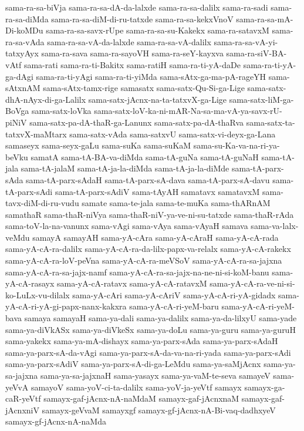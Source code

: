 {sama-ra-sa-biVja
sama-ra-sa-dA-da-lalxde
sama-ra-sa-dalilx
sama-ra-sadi
sama-ra-sa-diMda
sama-ra-sa-diM-di-ru-tatxde
sama-ra-sa-kekxVnoV
sama-ra-sa-mA-Di-koMDu
sama-ra-sa-savx-rUpe
sama-ra-sa-su-Kakekx
sama-ra-satavxM
sama-ra-sa-vAda
sama-ra-sa-vA-da-lalxde
sama-ra-sa-vA-dalilx
sama-ra-sa-vA-yi-tatxyAyx
sama-ra-sava
sama-ra-sayoVH
sama-ra-seY-kayxva
sama-ra-siV-BA-vAtf
sama-rati
sama-ra-ti-Bakitx
sama-ratiH
sama-ra-ti-yA-daDe
sama-ra-ti-yA-ga-dAgi
sama-ra-ti-yAgi
sama-ra-ti-yiMda
sama-sAtx-ga-ma-pA-rageYH
sama-sAtxnAM
sama-sAtx-tamx-rige
samasatx
sama-satx-Qu-Si-ga-Lige
sama-satx-dhA-nAyx-di-ga-Lalilx
sama-satx-jAcnx-na-ta-tatxvX-ga-Lige
sama-satx-liM-ga-BoVga
sama-satx-loVka
sama-satx-loV-ka-ni-mAR-Na-sa-ma-vA-ya-savx-rU-piNiV
sama-satx-pa-dA-thaR-ga-Lanunx
sama-satx-pa-dA-thaRva
sama-satx-ta-tatxvX-maMtarx
sama-satx-vAda
sama-satxvU
sama-satx-vi-deyx-ga-Lana
samaseyx
sama-seyx-gaLu
sama-suKa
sama-suKaM
sama-su-Ka-va-na-ri-ya-beVku
samatA
sama-tA-BA-va-diMda
sama-tA-guNa
sama-tA-guNaH
sama-tA-jala
sama-tA-jalaM
sama-tA-ja-la-diMda
sama-tA-ja-la-diMde
sama-tA-parx-sAda
sama-tA-parx-sAdaH
sama-tA-parx-sA-dava
sama-tA-parx-sA-davu
sama-tA-parx-sAdi
sama-tA-parx-sAdiV
sama-tAyAH
samatavx
samatavxM
sama-tavx-diM-di-ru-vudu
samate
sama-te-jala
sama-te-muKa
sama-thARnAM
samathaR
sama-thaR-niVya
sama-thaR-niV-ya-ve-ni-su-tatxde
sama-thaR-rAda
sama-toV-la-na-vanunx
sama-vAgi
sama-vAya
sama-vAyaH
samava
sama-va-lalx-veMdu
samayA
samayAH
sama-yA-cAra
sama-yA-cAraH
sama-yA-cA-rada
sama-yA-cA-ra-dalilx
sama-yA-cA-ra-da-lilx-papx-va-relalx
sama-yA-cA-rakekx
sama-yA-cA-ra-loV-peVna
sama-yA-cA-ra-meVSoV
sama-yA-cA-ra-sa-jajxna
sama-yA-cA-ra-sa-jajx-namf
sama-yA-cA-ra-sa-jajx-na-ne-ni-si-koM-banu
sama-yA-cA-rasayx
sama-yA-cA-ratavx
sama-yA-cA-ratavxM
sama-yA-cA-ra-ve-ni-si-ko-LuLx-vu-dilalx
sama-yA-cAri
sama-yA-cAriV
sama-yA-cA-ri-yA-gidadx
sama-yA-cA-ri-yA-gi-papx-nanx-kakxra
sama-yA-cA-ri-yeM-baru
sama-yA-cA-ri-yeM-bava
samaya
samayaH
sama-ya-dali
sama-ya-dalilx
sama-ya-da-lilxyU
sama-yade
sama-ya-diVkASx
sama-ya-diVkeSx
sama-ya-doLu
sama-ya-guru
sama-ya-guruH
sama-yakekx
sama-ya-mA-dishayx
sama-ya-parx-sAda
sama-ya-parx-sAdaH
sama-ya-parx-sA-da-vAgi
sama-ya-parx-sA-da-va-na-ri-yada
sama-ya-parx-sAdi
sama-ya-parx-sAdiV
sama-ya-parx-sA-di-ga-LeMdu
sama-ya-saMjAcnx
sama-ya-sa-jajxna
sama-ya-sa-jajxnaH
sama-yasayx
sama-ya-vaM-te-seva
samayeV
sama-yeVvA
samayoV
sama-yoV-ci-ta-dalilx
sama-yoV-ja-yeVtf
samayx
samayx-ga-caR-yeVtf
samayx-gaf-jAcnx-nA-naMdaM
samayx-gaf-jAcnxnaM
samayx-gaf-jAcnxniV
samayx-geVvaM
samayxgf
samayx-gf-jAcnx-nA-Bi-vaq-dadhxyeV
samayx-gf-jAcnx-nA-naMda
}
